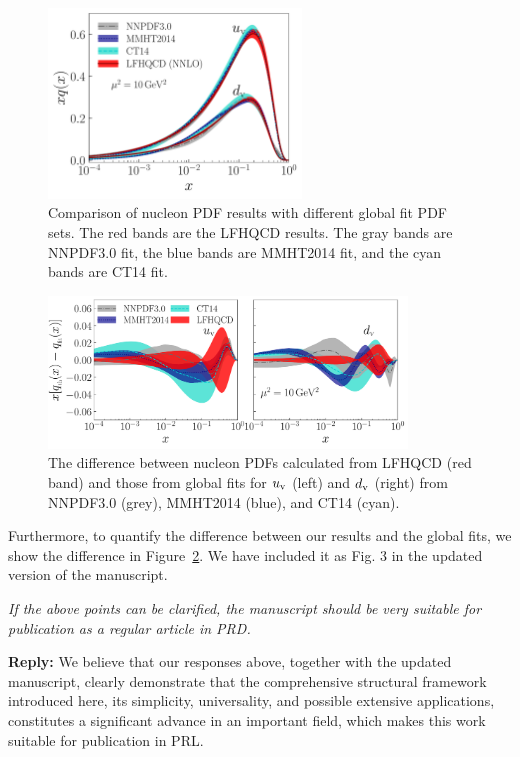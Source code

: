 \documentclass[12pt]{article}
\begin{document}
\begin{figure}[!h]
\centering
\includegraphics[width=0.6\textwidth]{proton-more-xf.pdf}
\caption{Comparison of nucleon PDF results with different global fit PDF sets. The red bands are the LFHQCD results. The gray bands are NNPDF3.0 fit, the blue bands are MMHT2014 fit, and the cyan bands are CT14 fit. \label{proton_more}}
\end{figure}
\begin{figure}[!h]
\centering
\includegraphics[width=0.85\textwidth]{proton-diff-xq.pdf}
\caption{The difference between nucleon PDFs calculated from LFHQCD (red band) and those from global fits for $u_{\rm v}$ (left) and $d_{\rm v}$ (right) from NNPDF3.0 (grey), MMHT2014 (blue), and CT14 (cyan).\label{proton_diff}}
\end{figure}

Furthermore, to quantify the difference between our results and the global fits, we show the difference in Figure~\ref{proton_diff}. We have included it as Fig. 3 in the updated version of the manuscript.


{\it If the above points can be clarified, the manuscript should be very
suitable for publication as a regular article in PRD.}


{\bf Reply:}  We believe that our responses above, together with the updated manuscript, clearly demonstrate  that the comprehensive structural framework introduced here, its simplicity, universality, and  possible extensive applications, constitutes a significant advance in an important field, which makes this work suitable for publication in PRL.
\end{document}
